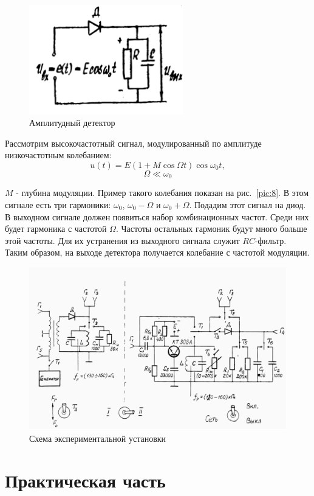 \begin{figure}[h!]
	\centering
	\includegraphics[width=0.6\textwidth]{picture/pic9.jpg}
	\caption{Амплитудный детектор}
	\label{pic:9}
\end{figure}
Рассмотрим высокочастотный сигнал, модулированный по амплитуде низкочастотным колебанием:
$$u(t)=E(1+M\cos{\Omega t})\cos{\omega_0 t},$$  $$\Omega \ll \omega_0 $$

$M$ - глубина модуляции. Пример такого колебания показан на рис.~\ref{pic:8}. В этом сигнале есть три гармоники: $ \omega_0 $, $ \omega_0 - \Omega$ и $\omega_0 + \Omega$. Подадим этот сигнал на диод. В выходном сигнале должен появиться набор комбинационных частот. Среди них будет гармоника с частотой $\Omega$. Частоты остальных гармоник будут много больше этой частоты. Для их устранения из выходного сигнала служит $RC$-фильтр. Таким образом, на выходе детектора получается колебание с частотой модуляции.

\begin{figure}[h!]
	\centering
	\includegraphics[width=\textwidth]{picture/pic10.jpg}
	\caption{Схема экспериментальной установки}
	\label{pic:10}
\end{figure}
\section{Практическая часть}
